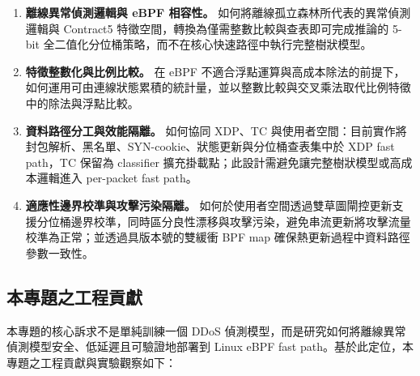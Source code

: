 \documentclass[12pt, a4paper, fontset=none]{ctexart}
\begin{document}
\begin{enumerate}
  \item \textbf{離線異常偵測邏輯與 eBPF 相容性。} 如何將離線孤立森林所代表的異常偵測邏輯與 Contract5 特徵空間，轉換為僅需整數比較與查表即可完成推論的 5-bit 全二值化分位桶策略，而不在核心快速路徑中執行完整樹狀模型。

  \item \textbf{特徵整數化與比例比較。} 在 eBPF 不適合浮點運算與高成本除法的前提下，如何運用可由連線狀態累積的統計量，並以整數比較與交叉乘法取代比例特徵中的除法與浮點比較。

  \item \textbf{資料路徑分工與效能隔離。} 如何協同 XDP、TC 與使用者空間：目前實作將封包解析、黑名單、SYN-cookie、狀態更新與分位桶查表集中於 XDP fast path，TC 保留為 classifier 擴充掛載點；此設計需避免讓完整樹狀模型或高成本邏輯進入 per-packet fast path。

  \item \textbf{適應性邊界校準與攻擊污染隔離。} 如何於使用者空間透過雙草圖閘控更新支援分位桶邊界校準，同時區分良性漂移與攻擊污染，避免串流更新將攻擊流量校準為正常；並透過具版本號的雙緩衝 BPF map 確保熱更新過程中資料路徑參數一致性。
\end{enumerate}

\subsection{本專題之工程貢獻}
本專題的核心訴求不是單純訓練一個 DDoS 偵測模型，而是研究如何將離線異常偵測模型安全、低延遲且可驗證地部署到 Linux eBPF fast path。基於此定位，本專題之工程貢獻與實驗觀察如下：
\end{document}
